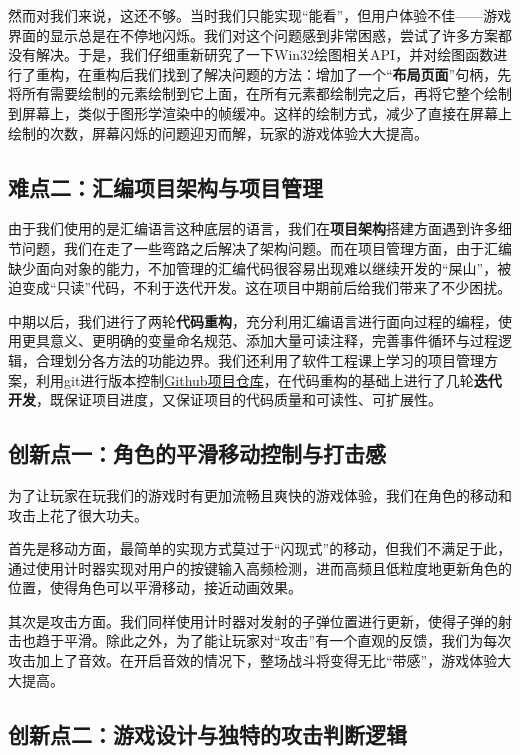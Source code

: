 \documentclass[lang=cn,11pt,a4paper]{elegantpaper}
\begin{document}
然而对我们来说，这还不够。当时我们只能实现“能看”，但用户体验不佳——游戏界面的显示总是在不停地闪烁。我们对这个问题感到非常困惑，尝试了许多方案都没有解决。于是，我们仔细重新研究了一下Win32绘图相关API，并对绘图函数进行了重构，在重构后我们找到了解决问题的方法：增加了一个“\textbf{布局页面}”句柄，先将所有需要绘制的元素绘制到它上面，在所有元素都绘制完之后，再将它整个绘制到屏幕上，类似于图形学渲染中的帧缓冲。这样的绘制方式，减少了直接在屏幕上绘制的次数，屏幕闪烁的问题迎刃而解，玩家的游戏体验大大提高。

\subsection{难点二：汇编项目架构与项目管理}

由于我们使用的是汇编语言这种底层的语言，我们在\textbf{项目架构}搭建方面遇到许多细节问题，我们在走了一些弯路之后解决了架构问题。而在项目管理方面，由于汇编缺少面向对象的能力，不加管理的汇编代码很容易出现难以继续开发的“屎山”，被迫变成“只读”代码，不利于迭代开发。这在项目中期前后给我们带来了不少困扰。

中期以后，我们进行了两轮\textbf{代码重构}，充分利用汇编语言进行面向过程的编程，使用更具意义、更明确的变量命名规范、添加大量可读注释，完善事件循环与过程逻辑，合理划分各方法的功能边界。我们还利用了软件工程课上学习的项目管理方案，利用git进行版本控制\href{https://github.com/linxt20/-INVERSUS_masm}{Github项目仓库}，在代码重构的基础上进行了几轮\textbf{迭代开发}，既保证项目进度，又保证项目的代码质量和可读性、可扩展性。

\subsection{创新点一：角色的平滑移动控制与打击感}

为了让玩家在玩我们的游戏时有更加流畅且爽快的游戏体验，我们在角色的移动和攻击上花了很大功夫。

首先是移动方面，最简单的实现方式莫过于“闪现式”的移动，但我们不满足于此，通过使用计时器实现对用户的按键输入高频检测，进而高频且低粒度地更新角色的位置，使得角色可以平滑移动，接近动画效果。

其次是攻击方面。我们同样使用计时器对发射的子弹位置进行更新，使得子弹的射击也趋于平滑。除此之外，为了能让玩家对“攻击”有一个直观的反馈，我们为每次攻击加上了音效。在开启音效的情况下，整场战斗将变得无比“带感”，游戏体验大大提高。

\subsection{创新点二：游戏设计与独特的攻击判断逻辑}
\end{document}
